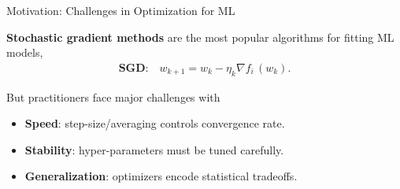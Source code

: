 \documentclass[notheorems]{beamer}
\def\\{}%
\begin{document}
    \begin{frame}{Motivation: Challenges in Optimization for ML}

        \textbf{Stochastic gradient methods} are the most popular algorithms for fitting ML models,
        \begin{align*}
            \textbf{SGD:} \quad w_{k + 1} = w_k - \eta_k \nabla f_i \, (w_k). \\
        \end{align*}


        But practitioners face major challenges with \vspace{0.5em}
        \begin{itemize}
            \item \textbf{Speed}: step-size/averaging controls convergence rate.
            \item \textbf{Stability}: hyper-parameters must be tuned carefully.
            \item \textbf{Generalization}: optimizers encode statistical tradeoffs.
        \end{itemize}
        \vspace{1em}

    \end{frame}
\end{document}
